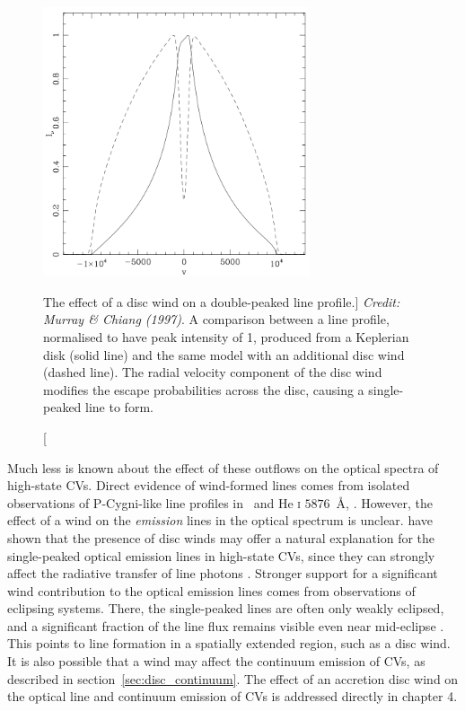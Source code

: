 \begin{figure}
\centering
\includegraphics[width=0.7\textwidth]{figures/02-outflows/mc_line.png}
\caption
[The effect of a disc wind on a double-peaked line profile.]
{
{\sl Credit: Murray \& Chiang (1997)}. 
A comparison between a line profile, normalised to have peak intensity of 1,
produced from a Keplerian disk (solid line) and the same model with an additional
disc wind (dashed line). The radial velocity component of the disc wind modifies
the escape probabilities across the disc, causing a single-peaked line to form.
} 
\label{fig:mc_line}
\end{figure}

Much less is known about the effect of these outflows on the optical
spectra of high-state CVs. Direct evidence of wind-formed lines comes from
isolated observations of P-Cygni-like line profiles in
\ha\ and He \textsc{i} $5876$~\AA, 
\citep{patterson1996, RN98, kafka2004}. 
However, the effect of a wind  on the {\em emission} lines in the optical 
spectrum is unclear.
\cite{MC96, MC97} have shown that the presence of disc winds may
offer a natural explanation for the single-peaked optical emission lines in
high-state CVs, since they can strongly affect the radiative transfer
of line photons \citep[Fig.~\ref{fig:mc_line}; also see][]{flohic2012}. 
Stronger support for a significant wind contribution to the
optical emission lines comes from observations of eclipsing
systems. There, the single-peaked lines are often only weakly
eclipsed, and a significant fraction of the line flux remains visible
even near mid-eclipse \citep[e.g.][]{baptista2000,groot2004}. 
This points to line formation in a spatially
extended region, such as a disc wind.
It is also possible that a wind may affect the continuum emission of CVs,
as described in section~\ref{sec:disc_continuum}. 
The effect of an accretion disc wind
on the optical line and continuum emission of CVs is addressed directly
in chapter 4.

